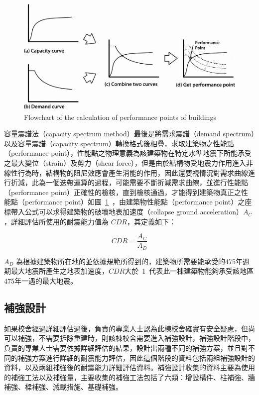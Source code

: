 \begin{figure}[hbtp]
  \begin{center}
    \includegraphics[width=1.0\textwidth]{figures/performance-point.png}
    \caption{Flowchart of the calculation of performance points of buildings} 
    \label{fig:performance-point}
  \end{center}
\end{figure}

容量震譜法（capacity spectrum method）最後是將需求震譜（demand spectrum）以及容量震譜（capacity spectrum）轉換格式後相疊，求取建築物之性能點（performance point），性能點之物理意義為該建築物在特定水準地震下所能承受之最大變位（strain）及剪力（shear force），但是由於結構物受地震力作用進入非線性行為時，結構物的阻尼效應會產生消能的作用，因此還要視情況對需求曲線進行折減，此為一個迭帶運算的過程，可能需要不斷折減需求曲線，並進行性能點（performance point）正確性的檢核，直到檢核通過，才能得到建築物真正之性能點（performance point）如圖~\ref{fig:performance-point}~，由建築物性能點（performance point）之座標帶入公式可以求得建築物的破壞地表加速度（collapse ground acceleration）$A_C$，詳細評估所使用的耐震能力值為 $CDR$，其定義如下：


\begin{equation} CDR = \dfrac{A_C}{A_D} \label{eq:CDR}\end{equation} 

$A_D$ 為根據建築物所在地的並依據規範所得到的，建築物所需要能承受的475年週期最大地震所產生之地表加速度，$CDR$大於~1~代表此一棟建築物能夠承受該地區475年一遇的最大地震。

\subsection{補強設計}

如果校舍經過詳細評估過後，負責的專業人士認為此棟校舍確實有安全疑慮，但尚可以補強，不需要拆除重建時，則該棟校舍需要進入補強設計，補強設計階段中，負責的專業人士需要依據詳細評估的結果，設計出兩種不同的補強方案，並且對不同的補強方案進行詳細的耐震能力評估，因此這個階段的資料包括兩組補強設計的資料，以及兩組補強後的耐震能力詳細評估資料。補強設計收集的資料主要為使用的補強工法以及補強量，主要收集的補強工法包括了六類：增設構件、柱補強、牆補強、樑補強、減載措施、基礎補強。

